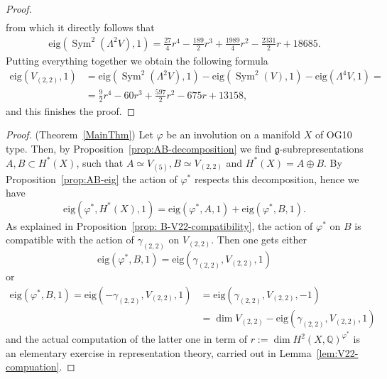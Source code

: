 \documentclass[a4paper,11pt]{amsart}
\newcommand{\Q}{{\mathbb Q}}
\newcommand{\eig}{{\mathrm{eig}}}
\newcommand{\V}[2]{V_{(#1,#2)}}
\newcommand{\Ver}{V_{(5)}}
\newcommand{\kg}{{\mathfrak g}}
\DeclareMathOperator{\Sym}{Sym}
\theoremstyle{plain}
\theoremstyle{remark}
\begin{document}
\begin{proof}
\begin{align*}
\end{align*}
 from which it directly follows that
\begin{align*}
    \eig(\Sym^2(\Lambda^2V),1)=
    \frac{27}{4}r^4 - \frac{189}{2}r^3 + \frac{1989}{4}r^2 - \frac{2331}{2}r + 18685.
\end{align*}
Putting everything together we obtain the following formula
\begin{align*}
   \eig(V_{(2,2)},1)&= \eig(\Sym^2(\Lambda^2V),1)- \eig(\Sym^2(V),1)- \eig(\Lambda^4V,1)=\\
   &=\frac{9}{2}r^4 - 60r^3 + \frac{597}{2}r^2 - 675r + 13158,
\end{align*}
and this finishes the proof.

\end{proof}


\begin{proof}(Theorem~\ref{MainThm})
    Let $\varphi$ be an involution on a manifold \(X\) of OG10 type. Then, by Proposition~\ref{prop:AB-decomposition} we find $\kg$-subrepresentations $A,B\subset H^*(X)$, such that $A\simeq \Ver, B\simeq \V22$ and $H^*(X) = A \oplus B$. By Proposition~\ref{prop:AB-eig} the action of $\varphi^*$ respects this decomposition, hence we have
    \[
    \eig(\varphi^*, H^*(X), 1) = \eig(\varphi^*, A, 1) + \eig(\varphi^*, B, 1).
    \]
    As explained in Proposition~\ref{prop: B-V22-compatibility}, the action of $\varphi^*$ on $B$ is compatible with the action of $\gamma_{(2,2)}$ on $\V22$. Then one gets either
    \[\eig(\varphi^*, B, 1) = \eig(\gamma_{(2,2)}, \V22,  1)\] or
    \begin{align*}
    \eig(\varphi^*, B, 1) = \eig(-\gamma_{(2,2)}, \V22, 1)
 &= \eig(\gamma_{(2,2)}, \V22, -1)\\
 &= \dim \V22-\eig(\gamma_{(2,2)}, \V22, 1)
    \end{align*}
    and the actual computation of the latter one in term of $r:=\dim H^2(X,\Q)^{\varphi^*}$ is an elementary exercise in representation theory, carried out in Lemma~\ref{lem:V22-compuation}.


\end{proof}
\end{document}
